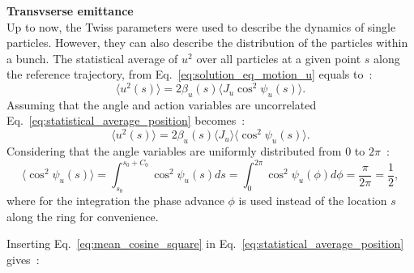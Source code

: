  \textbf{Transvserse emittance}\\
Up to now, the Twiss parameters were used to describe the dynamics of single particles. However, they can also describe the distribution of the particles within a bunch. The statistical average of $u^2$ over all particles at a given point $s$ along the reference trajectory, from Eq.~\eqref{eq:solution_eq_motion_u} equals to~\cite{wolski2014}:
 \begin{equation}\label{eq:statistical_average_position}
     \langle u^2(s) \rangle = 2 \beta_u(s) \langle J_u \cos^2{\psi_u(s)} \rangle.
 \end{equation}
 Assuming that the angle and action variables are uncorrelated Eq.~\eqref{eq:statistical_average_position} becomes~\cite{wolski2014}:
 \begin{equation}\label{eq:statistical_average_position_2}
     \langle u^2(s) \rangle = 2 \beta_u(s) \langle J_u \rangle \langle \cos^2{\psi_u(s)} \rangle.
 \end{equation}
 Considering that the angle variables are uniformly distributed from 0 to $2\pi$~\cite{wolski2014}: %
 \begin{equation}\label{eq:mean_cosine_square}
     \langle \cos^2{\psi_u(s)} \rangle = \int_{s_0}^{s_0+C_0} \cos^2{\psi_u(s)} ds =   \int_0^{2\pi} \cos^2{\psi_u(\phi)} d\phi = \frac{\pi}{2\pi} = \frac{1}{2},
 \end{equation}
 where for the integration the phase advance $\phi$ is used instead of the location $s$ along the ring for convenience. %
 
 Inserting Eq.~\eqref{eq:mean_cosine_square} in Eq.~\eqref{eq:statistical_average_position} gives~\cite{wolski2014}:
 
